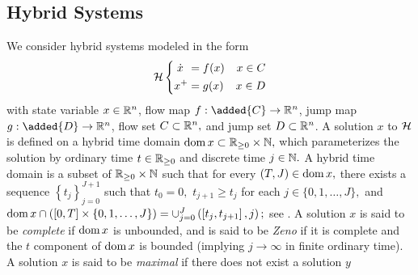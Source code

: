 
\subsection{Hybrid Systems}
We consider hybrid systems modeled in the form \cite{goebel_hybrid_2012,sanfelice_hybrid_2021}
\begin{equation}
    {\mathcal{H}} \left\{\begin{aligned}
        \dot{x} \hspace{4pt}&= f(x) & x \in C \\
        x^+ &= g(x) & x \in D
    \end{aligned}\right. 
    \label{eq:hybrid system}
\end{equation}
with state variable $x\in \mathbb{R}^{n}$, 
flow map $f : \added{C} \to \realsn$, 
jump map $g : \added{D} \to \realsn$, 
flow set $C \subset \mathbb{R}^{n},$ and
jump set $D \subset \mathbb{R}^{n}$.
A solution $x$ to ${\mathcal{H}}$ is defined on a hybrid time 
domain $\operatorname{dom} x \subset \mathbb{R}_{\geq0} \times \mathbb{N},$ 
which parameterizes the solution by ordinary time 
$t \in \mathbb{R}_{\geq0}$ and discrete time $j \in \mathbb{N}.$
A hybrid time domain is a subset of $\mathbb{R}_{\geq0} \times \mathbb{N}$
such that for every $(T, J) \in \operatorname{dom} x,$ 
there exists a sequence \(\left\{t_{j}\right\}_{j=0}^{J+1}\) such that 
\(t_{0}= 0,\) \(t_{j+1} \geq t_{j}\) 
for each \(j \in\{0,1, \ldots, J\},\) and
$\operatorname{dom} x \cap ([0, T] \times \{0, 1, \dots, J\})
=\cup_{j=0}^{J}\left(\left[t_{j}, t_{j+1}\right], j\right);$ 
see \cite{goebel_hybrid_2012}.
A solution $x$ is said to be \emph{complete} if $\operatorname{dom} x$ is unbounded, 
and is said to be \emph{Zeno} if it is complete 
and the $t$ component of $\operatorname{dom} x$ is bounded 
(implying $j \to \infty$ in finite ordinary time). 
A solution $x$ is said to be \emph{maximal} if there does not exist a solution $y$
